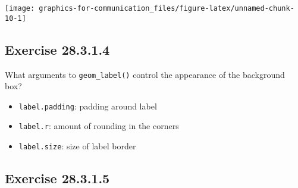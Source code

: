 \documentclass[]{book}
\newenvironment{Shaded}{\begin{snugshade}}{\end{snugshade}}
\newcommand{\DataTypeTok}[1]{\textcolor[rgb]{0.13,0.29,0.53}{#1}}
\newcommand{\DecValTok}[1]{\textcolor[rgb]{0.00,0.00,0.81}{#1}}
\newcommand{\KeywordTok}[1]{\textcolor[rgb]{0.13,0.29,0.53}{\textbf{#1}}}
\newcommand{\NormalTok}[1]{#1}
\newcommand{\OperatorTok}[1]{\textcolor[rgb]{0.81,0.36,0.00}{\textbf{#1}}}
\newcommand{\OtherTok}[1]{\textcolor[rgb]{0.56,0.35,0.01}{#1}}
\newcommand{\StringTok}[1]{\textcolor[rgb]{0.31,0.60,0.02}{#1}}
\providecommand{\tightlist}{%
  \setlength{\itemsep}{0pt}\setlength{\parskip}{0pt}}
\theoremstyle{plain}
\theoremstyle{remark}
\begin{document}
\begin{Shaded}
\end{Shaded}

\begin{center}\texttt{[image: graphics-for-communication\_files/figure-latex/unnamed-chunk-10-1]} \end{center}

\hypertarget{exercise-28.3.1.4}{%
\subsection*{\texorpdfstring{Exercise
{28.3.1.4}}{Exercise 28.3.1.4}}\label{exercise-28.3.1.4}}

What arguments to \texttt{geom\_label()} control the appearance of the
background box?

\begin{itemize}
\tightlist
\item
  \texttt{label.padding}: padding around label
\item
  \texttt{label.r}: amount of rounding in the corners
\item
  \texttt{label.size}: size of label border
\end{itemize}

\hypertarget{exercise-28.3.1.5}{%
\subsection*{\texorpdfstring{Exercise
{28.3.1.5}}{Exercise 28.3.1.5}}\label{exercise-28.3.1.5}}
\end{document}

